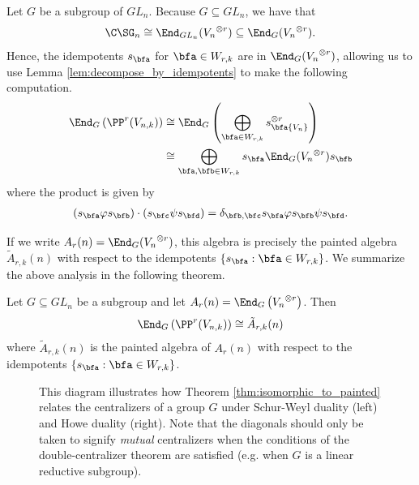 Let $G$ be a subgroup of $GL_n$. Because $G\subseteq GL_n$, we have that\[\C\SG_n\cong\End_{GL_n}({V_n}^{\otimes r})\subseteq \End_G({V_n}^{\otimes r}).\] Hence, the idempotents $s_\bfa$ for $\bfa\in W_{r,k}$ are in $\End_G({V_n}^{\otimes r})$, allowing us to use Lemma \ref{lem:decompose_by_idempotents} to make the following computation. \begin{align*}
    \End_G\left(\PP^r(V_{n,k})\right)&\cong\End_G\left(\bigoplus_{\bfa\in W_{r,k}}s_\bfa {V_n}^{\otimes r}\right)\\
    &\cong\bigoplus_{\bfa,\bfb\in W_{r,k}}s_\bfa\End_G({V_n}^{\otimes r})s_\bfb
\end{align*} where the product is given by \begin{align}
    (s_\bfa\varphi s_\bfb)\cdot(s_\bfc\psi s_\bfd)=\delta_{\bfb,\bfc}s_\bfa\varphi s_\bfb \psi s_\bfd.
\end{align}

If we write $A_r(n)=\End_G({V_n}^{\otimes r})$, this algebra is precisely the painted algebra $\tilde{A}_{r,k}(n)$ with respect to the idempotents $\{s_\bfa:\bfa\in W_{r,k}\}$. We summarize the above analysis in the following theorem.

\begin{theorem}\label{thm:isomorphic_to_painted} Let $G\subseteq GL_n$ be a subgroup and let $A_r(n)=\End_G\left({V_n}^{\otimes r}\right)$. Then\[\End_G\left(\PP^r(V_{n,k})\right)\cong \tilde{A}_{r,k}(n)\] where $\tilde{A}_{r,k}(n)$ is the painted algebra of $A_r(n)$ with respect to the idempotents $\{s_\bfa:\bfa\in W_{r,k}\}$.
\end{theorem}

\begin{figure}[ht]
    \centering
    \caption{This diagram illustrates how Theorem \ref{thm:isomorphic_to_painted} relates the centralizers of a group $G$ under Schur-Weyl duality (left) and Howe duality (right). Note that the diagonals should only be taken to signify \textit{mutual} centralizers when the conditions of the double-centralizer theorem are satisfied (e.g. when $G$ is a linear reductive subgroup).}
    \label{fig:seesaw}
\end{figure}

